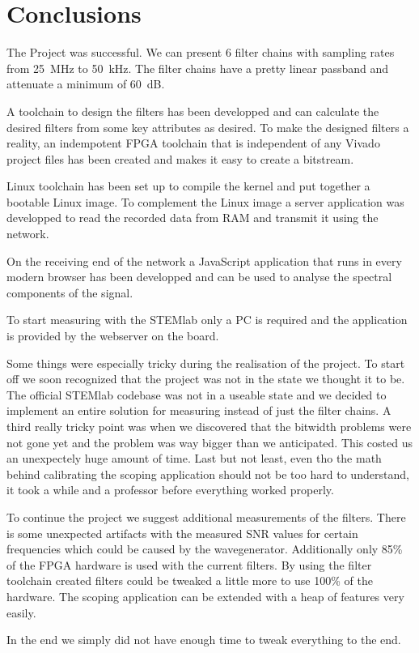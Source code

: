 \chapter{Conclusions}
\label{ch:conclusions}

The Project was successful. We can present 6 filter chains with sampling rates from \SI{25}{\mega\Hz} to \SI{50}{\kilo\Hz}. The filter chains have a pretty linear passband and attenuate a minimum of \SI{60}{\dB}.

A toolchain to design the filters has been developped and can calculate the desired filters from some key attributes as desired.
To make the designed filters a reality, an indempotent FPGA toolchain that is independent of any Vivado project files has been created and makes it easy to create a bitstream.

Linux toolchain has been set up to compile the kernel and put together a bootable Linux image. To complement the Linux image a server application was developped to read the recorded data from RAM and transmit it using the network.

On the receiving end of the network a JavaScript application that runs in every modern browser has been developped and can be used to analyse the spectral components of the signal.

To start measuring with the STEMlab only a PC is required and the application is provided by the webserver on the board.


Some things were especially tricky during the realisation of the project.
To start off we soon recognized that the project was not in the state we thought it to be. The official STEMlab codebase was not in a useable state and we decided to implement an entire solution for measuring instead of just the filter chains.
A third really tricky point was when we discovered that the bitwidth problems were not gone yet and the problem was way bigger than we anticipated. This costed us an unexpectely huge amount of time.
Last but not least, even tho the math behind calibrating the scoping application should not be too hard to understand, it took a while and a professor before everything worked properly.


To continue the project we suggest additional measurements of the filters. There is some unexpected artifacts with the measured SNR values for certain frequencies which could be caused by the wavegenerator.
Additionally only 85\% of the FPGA hardware is used with the current filters. By using the filter toolchain created filters could be tweaked a little more to use 100\% of the hardware.
The scoping application can be extended with a heap of features very easily.

In the end we simply did not have enough time to tweak everything to the end.